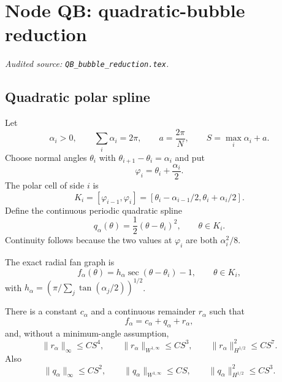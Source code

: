 \begingroup
\section{Node QB: quadratic-bubble reduction}
\label{module:QB}
\noindent\textit{Audited source: \nolinkurl{QB_bubble_reduction.tex}.}
\subsection{Quadratic polar spline}

Let
\begin{equation}\label{QB:eq:fan}
 \alpha_i>0,\qquad \sum_i\alpha_i=2\pi,
 \qquad a=\frac{2\pi}{N},\qquad S=\max_i\alpha_i+a.
\end{equation}
Choose normal angles $\theta_i$ with
$\theta_{i+1}-\theta_i=\alpha_i$ and put
\begin{equation}\label{QB:eq:vertex}
 \varphi_i=\theta_i+\frac{\alpha_i}{2}.
\end{equation}
The polar cell of side $i$ is
\begin{equation}\label{QB:eq:cell}
 K_i=[\varphi_{i-1},\varphi_i]
 =[\theta_i-\alpha_{i-1}/2,\theta_i+\alpha_i/2].
\end{equation}
Define the continuous periodic quadratic spline
\begin{equation}\label{QB:eq:q}
 q_\alpha(\theta)=\frac12(\theta-\theta_i)^2,
 \qquad \theta\in K_i.
\end{equation}
Continuity follows because the two values at $\varphi_i$ are both
$\alpha_i^2/8$.

The exact radial fan graph is
\begin{equation}\label{QB:eq:f}
 f_\alpha(\theta)=h_\alpha\sec(\theta-\theta_i)-1,
 \qquad \theta\in K_i,
\end{equation}
with
$h_\alpha=(\pi/\sum_j\tan(\alpha_j/2))^{1/2}$.

\begin{lemma}
\label{QB:lem:split}
There is a constant $c_\alpha$ and a continuous remainder $r_\alpha$ such
that
\begin{equation}\label{QB:eq:split}
 f_\alpha=c_\alpha+q_\alpha+r_\alpha,
\end{equation}
and, without a minimum-angle assumption,
\begin{equation}\label{QB:eq:r-size}
 \|r_\alpha\|_\infty\le CS^4,
 \qquad \|r_\alpha\|_{W^{1,\infty}}\le CS^3,
 \qquad \|r_\alpha\|_{H^{1/2}}^2\le CS^7.
\end{equation}
Also
\begin{equation}\label{QB:eq:q-size}
 \|q_\alpha\|_\infty\le CS^2,
 \qquad \|q_\alpha\|_{W^{1,\infty}}\le CS,
 \qquad \|q_\alpha\|_{H^{1/2}}^2\le CS^3.
\end{equation}
\end{lemma}

